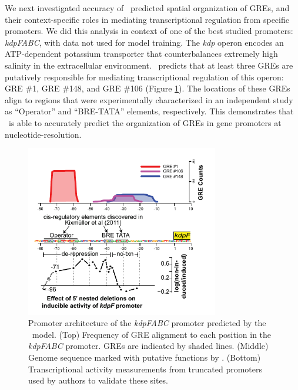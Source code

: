 We next investigated accuracy of \egrine~predicted spatial organization of GREs, and their context-specific roles in mediating transcriptional regulation from specific promoters. We did this analysis in context of one of the best studied \halo promoters: \textit{kdpFABC}, with data not used for model training. The \textit{kdp} operon encodes an ATP-dependent potassium transporter that counterbalances extremely high salinity in the extracellular environment. \egrine~predicts that at least three GREs are putatively responsible for mediating transcriptional regulation of this operon: GRE \#1, GRE \#148, and GRE \#106 (Figure \ref{fig:egrin2:2:C}). The locations of these GREs align to regions that were experimentally characterized in an independent study as “Operator” and “BRE-TATA” elements, respectively. This demonstrates that \egrine~is able to accurately predict the organization of GREs in gene promoters at nucleotide-resolution.

\begin{figure}[h!]
    \centering
    \includegraphics[width=0.75\textwidth]{figures/egrin2_kdpvalidaton}
 	\caption[\egrine~Model Validation: Regulatory elements of \textit{kdp} operon, \halo]{Promoter architecture of the \halo \textit{kdpFABC} promoter predicted by the \egrine~model. (Top) Frequency of GRE alignment to each position in the \textit{kdpFABC} promoter. GREs are indicated by shaded lines. (Middle) Genome sequence marked with putative functions by \cite{kixmller_archaeal_2011}. (Bottom) Transcriptional activity measurements from truncated promoters used by authors to validate these sites. 
}
    \label{fig:egrin2:2:C}
\end{figure}

